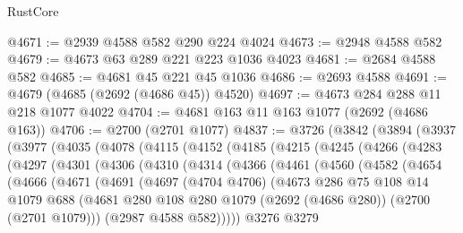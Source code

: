 \begin{lexlean}{RustCore}
\begin{coremodule}
@4671 := @2939 @4588 @582 @290 @224 @4024
@4673 := @2948 @4588 @582
@4679 := @4673 @63 @289 @221 @223 @1036 @4023
@4681 := @2684 @4588 @582
@4685 := @4681 @45 @221 @45 @1036
@4686 := @2693 @4588
@4691 := @4679 (@4685 (@2692 (@4686 @45)) @4520)
@4697 := @4673 @284 @288 @11 @218 @1077 @4022
@4704 := @4681 @163 @11 @163 @1077 (@2692 (@4686 @163))
@4706 := @2700 (@2701 @1077)
@4837 := @3726
    (@3842
      (@3894
        (@3937
          (@3977
            (@4035
              (@4078
                (@4115
                  (@4152
                    (@4185
                      (@4215
                        (@4245
                          (@4266
                            (@4283
                              (@4297
                                (@4301
                                  (@4306
                                    (@4310
                                      (@4314
                                        (@4366
                                          (@4461
                                            (@4560
                                              (@4582
                                                (@4654
                                                  (@4666
                                                    (@4671
                                                      (@4691
                                                        (@4697
                                                          (@4704 @4706)
                                                          (@4673
                                                            @286
                                                            @75
                                                            @108
                                                            @14
                                                            @1079
                                                            @688
                                                            (@4681
                                                              @280
                                                              @108
                                                              @280
                                                              @1079
                                                              (@2692 (@4686 @280))
                                                              (@2700 (@2701 @1079)))
                                                            (@2987 @4588 @582)))))
                                                    @3276
                                                    @3279

\end{coremodule}
\end{lexlean}
